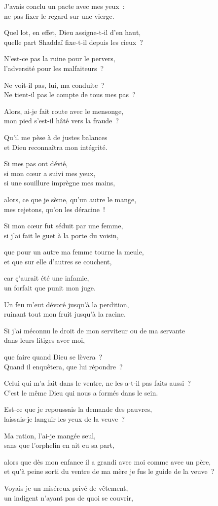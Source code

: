 \documentclass[twoside]{book} %
\newcommand{\lnatt}[1]{\reversemarginpar\marginpar[\sffamily\scriptsize #1]{}}
\newcommand{\lpar}[1]{\noindent\hangindent=2\parindent  #1\par} %
\renewcommand{\lnatt}[1]{\marginpar{\sffamily\scriptsize #1}}
\begin{document}
\lpar{J’avais conclu un pacte avec mes yeux : \\
ne pas fixer le regard sur une vierge.}
\lpar{Quel lot, en effet, Dieu assigne-t-il d’en haut, \\
quelle part Shaddaï fixe-t-il depuis les cieux ?}
\lpar{N’est-ce pas la ruine pour le pervers, \\
l’adversité pour les malfaiteurs ?}
\lpar{Ne voit-il pas, lui, ma conduite ? \\
Ne tient-il pas le compte de tous mes pas ?}
\lpar{\lnatt{5}Alors, ai-je fait route avec le mensonge, \\
mon pied s’est-il hâté vers la fraude ?}
\lpar{Qu’il me pèse à de justes balances \\
et Dieu reconnaîtra mon intégrité.}
\bigskip
\lpar{Si mes pas ont dévié, \\
si mon cœur a suivi mes yeux, \\
si une souillure imprègne mes mains,}
\lpar{alors, ce que je sème, qu’un autre le mange, \\
mes rejetons, qu’on les déracine !}
\lpar{Si mon cœur fut séduit par une femme, \\
si j’ai fait le guet à la porte du voisin,}
\lpar{\lnatt{10}que pour un autre ma femme tourne la meule, \\
et que sur elle d’autres se couchent,}
\lpar{car ç’aurait été une infamie, \\
un forfait que punit mon juge.}
\lpar{Un feu m’eut dévoré jusqu’à la perdition, \\
ruinant tout mon fruit jusqu’à la racine.}
\lpar{Si j’ai méconnu le droit de mon serviteur ou de ma servante \\
dans leurs litiges avec moi,}
\lpar{que faire quand Dieu se lèvera ? \\
Quand il enquêtera, que lui répondre ?}
\lpar{\lnatt{15}Celui qui m’a fait dans le ventre, ne les a-t-il pas faits aussi ? \\
C’est le même Dieu qui nous a formés dans le sein.}
\bigskip
\lpar{Est-ce que je repoussais la demande des pauvres, \\
laissais-je languir les yeux de la veuve ?}
\lpar{Ma ration, l’ai-je mangée seul, \\
sans que l’orphelin en ait eu sa part,}
\lpar{alors que dès mon enfance il a grandi avec moi comme avec un père, \\
et qu’à peine sorti du ventre de ma mère je fus le guide de la veuve ?}
\lpar{Voyais-je un miséreux privé de vêtement, \\
un indigent n’ayant pas de quoi se couvrir,}
\end{document}
